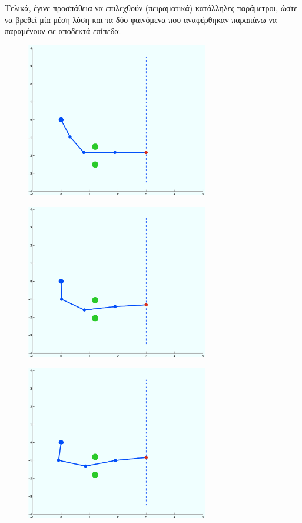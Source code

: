 \documentclass[a4paper, 11pt, english, greek]{article}
\begin{document}
Τελικά, έγινε προσπάθεια να επιλεχθούν (πειραματικά) κατάλληλες παράμετροι, ώστε να βρεθεί μία μέση λύση
και τα δύο φαινόμενα που αναφέρθηκαν παραπάνω να παραμένουν σε αποδεκτά επίπεδα.

\begin{figure}[htb]
  \centering
  \includegraphics[width=300px]{test1}
  \caption{}
\end{figure}

\begin{figure}[htb]
  \centering
  \includegraphics[width=300px]{test2}
  \caption{}
\end{figure}

\begin{figure}[htb]
  \centering
  \includegraphics[width=300px]{test3}
  \caption{}
\end{figure}
\end{document}
